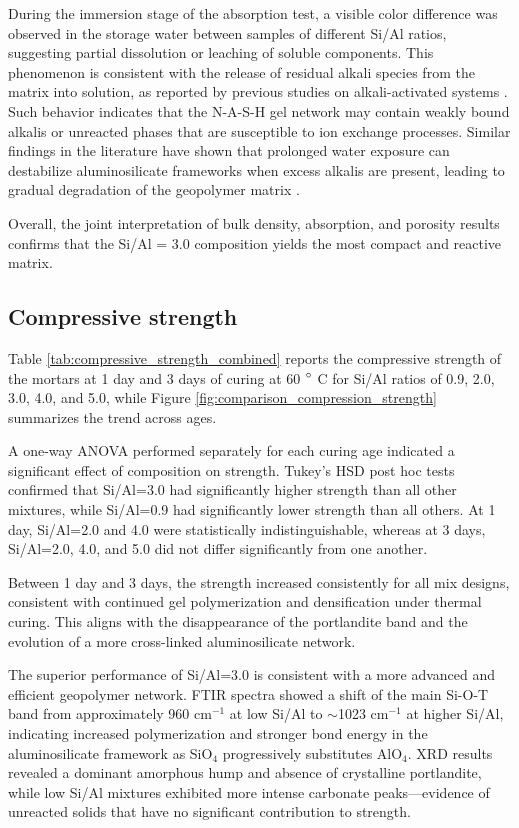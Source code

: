 During the immersion stage of the absorption test, a visible color difference was observed in the storage water between samples of different Si/Al ratios, suggesting partial dissolution or leaching of soluble components.
This phenomenon is consistent with the release of residual alkali species from the matrix into solution, as reported by previous studies on alkali-activated systems \cite{pachecotorgal2014handbook}.
Such behavior indicates that the N-A-S-H gel network may contain weakly bound alkalis or unreacted phases that are susceptible to ion exchange processes.
Similar findings in the literature have shown that prolonged water exposure can destabilize aluminosilicate frameworks when excess alkalis are present, leading to gradual degradation of the geopolymer matrix \cite{Brito2008}.

Overall, the joint interpretation of bulk density, absorption, and porosity results confirms that the Si/Al = 3.0 composition yields the most compact and reactive matrix.

\subsection{Compressive strength}

Table \ref{tab:compressive_strength_combined} reports the compressive strength of the mortars at 1 day and 3 days of curing at 60 $^{\circ}$ C for Si/Al ratios of 0.9, 2.0, 3.0, 4.0, and 5.0, while Figure \ref{fig:comparison_compression_strength} summarizes the trend across ages.  

A one-way ANOVA performed separately for each curing age indicated a significant effect of composition on strength.
Tukey's HSD post hoc tests confirmed that Si/Al=3.0 had significantly higher strength than all other mixtures, while Si/Al=0.9 had significantly lower strength than all others.  
At 1 day, Si/Al=2.0 and 4.0 were statistically indistinguishable, whereas at 3 days, Si/Al=2.0, 4.0, and 5.0 did not differ significantly from one another.

Between 1 day and 3 days, the strength increased consistently for all mix designs, consistent with continued gel polymerization and densification under thermal curing.
This aligns with the disappearance of the portlandite band and the evolution of a more cross-linked aluminosilicate network.  

The superior performance of Si/Al=3.0 is consistent with a more advanced and efficient geopolymer network.
FTIR spectra showed a shift of the main Si-O-T band from approximately 960 cm$^{-1}$ at low Si/Al to $\sim$1023 cm$^{-1}$ at higher Si/Al, indicating increased polymerization and stronger bond energy in the aluminosilicate framework as SiO$_4$ progressively substitutes AlO$_4$.  
XRD results revealed a dominant amorphous hump and absence of crystalline portlandite, while low Si/Al mixtures exhibited more intense carbonate peaks—evidence of unreacted solids that have no significant contribution to strength.  

